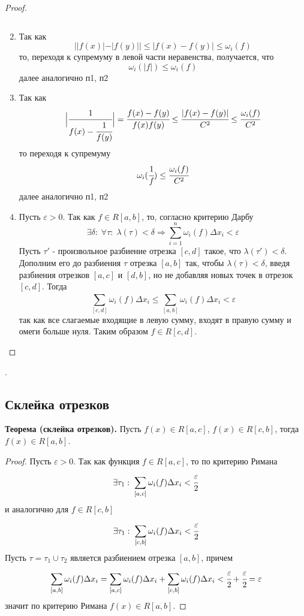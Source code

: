 \documentclass{article}
\newcommand*{\theorem}[2]{\textbf{Теорема #1. } #2 \newline}
\newcommand*{\eps}{\varepsilon}
\begin{document}
\begin{proof}
\begin{enumerate}
$$        $$
        \item Так как 
        $$
            ||f(x)| - |f(y)|| \leq |f(x) - f(y)| \leq \omega_i(f)
        $$
        то, переходя к супремуму в левой части неравенства, получается, что 
        $$
            \omega_i(|f|) \leq \omega_i(f)
        $$
        далее аналогично п1, п2
        \item Так как 
        $$
            \Bigl| \cfrac{1}{f(x) - \cfrac{1}{f(y)}} \Bigr| = \cfrac{f(x) - f(y)}{f(x)f(y)} \leq \cfrac{|f(x) - f(y)|}{C^2} \leq \cfrac{\omega_i(f)}{C^2}
        $$
        то переходя к супремуму
        $$
            \omega_i(\cfrac{1}{f}) \leq \cfrac{\omega_i(f)}{C^2}
        $$
        далее аналогично п1, п2
        \item Пусть $\eps > 0$. Так как $f \in R[a, b]$, то, согласно критерию Дарбу
        $$
            \exists \delta : \; \forall \tau : \; \lambda(\tau) < \delta \Rightarrow \sum_{i = 1}^{n} \omega_i(f)\Delta x_i < \eps
        $$
        Пусть $\tau'$ - произвольное разбиение отрезка $[c, d]$ такое, что $\lambda(\tau') < \delta$. Дополним его до разбиения $\tau$ отрезка $[a, b]$ так, чтобы $\lambda(\tau) < \delta$, введя разбиения отрезков $[a, c]$ и $[d, b]$, но не добавляя новых точек в отрезок $[c, d]$. Тогда
        $$
            \sum_{[c, d]}^{} \omega_i(f)\Delta x_i \leq \sum_{[a, b]}^{}\omega_i(f)\Delta x_i < \eps
        $$
        так как все слагаемые входящие в левую сумму, входят в правую сумму и омеги больше нуля. Таким образом $f \in R[c, d]$.
    \end{enumerate}
\end{proof}
.\newline 
\subsection{Склейка отрезков}
\theorem{(склейка отрезков)}{Пусть $f(x) \in R[a, c]$, $f(x) \in R[c, b]$, тогда $f(x) \in R[a, b]$.}
\begin{proof}
    Пусть $\eps > 0$. Так как функция $f \in R[a, c]$, то по критерию Римана
    $$
        \exists \tau_1: \; \sum_{[a, c]}^{} \omega_i(f)\Delta x_i < \cfrac{\eps}{2}
    $$
    и аналогично для $f \in R[c, b]$
    $$
        \exists \tau_1: \; \sum_{[c, b]}^{} \omega_i(f)\Delta x_i < \cfrac{\eps}{2}
    $$
    Пусть $\tau = \tau_1 \cup \tau_2$ является разбиением отрезка $[a, b]$, причем
    $$
        \sum_{[a, b]}^{}\omega_i(f)\Delta x_i = \sum_{[a, c]}^{} \omega_i(f)\Delta x_i + \sum_{[c, b]}^{} \omega_i(f)\Delta x_i < \cfrac{\eps}{2} + \cfrac{\eps}{2} = \eps
    $$
    значит по критерию Римана $f(x) \in R[a, b]$.
\end{proof}
\end{document}
